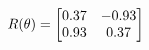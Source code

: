 \documentclass[preview]{standalone}
\begin{document}
\begin{align*}
\special{dvisvgm:raw <g id='unique000'>}R(\theta) = \begin{bmatrix}0.37 & -0.93\\0.93 & 0.37\end{bmatrix}\special{dvisvgm:raw </g>}
\end{align*}
\end{document}
